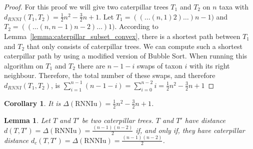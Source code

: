 \documentclass[11pt, a4paper]{article}
\newcommand{\rnniu}{\mathrm{RNNIu}}
\newtheorem{lemma}[definition]{Lemma}
\newtheorem{corollary}[definition]{Corollary}
\begin{document}
\begin{proof}
    For this proof we will give two caterpillar trees $T_1$ and $T_2$ on $n$ taxa with $d_{RNNI}(T_1,T_2) = \frac{1}{2}n^2-\frac{3}{2}n+1$.
	Let $T_1 = (( \dots (n,1)2)\dots)n-1)$ and $T_2 = (( \dots (n,n-1)n-2)\dots)1)$.
    According to Lemma~\ref{lemma:caterpillar_subset_convex}, there is a shortest path between $T_1$ and $T_2$ that only consists of caterpillar trees.
    We can compute such a shortest caterpillar path by using a modified version of Bubble Sort.
    When running this algorithm on $T_1$ and $T_2$ there are $n-1-i$ swaps of taxon $i$ with its right neighbour.
    Therefore, the total number of these swaps, and therefore $d_{RNNI}(T_1,T_2)$, is $\sum\limits_{i=1}^{n-1}(n-1-i) = \sum\limits_{i=0}^{n-2}i = \frac{1}{2}n^2-\frac{3}{2}n+1$
\end{proof}

\begin{corollary}
It is $\Delta(\rnniu) = \frac{1}{2}n^2-\frac{3}{2}n+1$.
\end{corollary}


\begin{lemma}
    Let $T$ and $T'$ be two caterpillar trees.
    $T$ and $T'$ have distance $d(T,T') = \Delta(\rnniu) = \frac{(n-1)(n-2)}{2}$ if, and only if, they have caterpillar distance $d_c(T,T') = \Delta(\rnniu) = \frac{(n-1)(n-2)}{2}$. 
    \label{lemma:caterpillar_dist=diameter}
\end{lemma}

\end{document}
